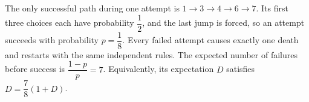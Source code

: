 The only successful path during one attempt is $1\to3\to4\to6\to7$. Its first three choices each have probability $\dfrac{1}{2}$, and the last jump is forced, so an attempt succeeds with probability $p=\dfrac{1}{8}$. Every failed attempt causes exactly one death and restarts with the same independent rules. The expected number of failures before success is $\dfrac{1-p}{p}=\boxed7$. Equivalently, its expectation $D$ satisfies $D=\dfrac{7}{8}(1+D)$.
